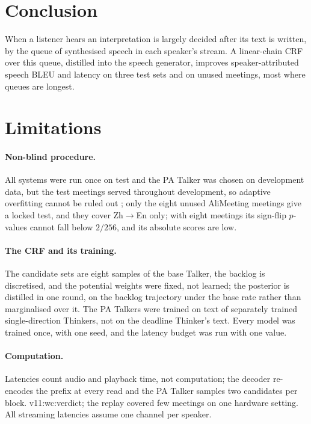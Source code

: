 \section{Conclusion}
\label{sec:conclusion}

When a listener hears an interpretation is largely decided after its text is written, by the queue of synthesised
speech in each speaker's stream. A linear-chain CRF over this queue, distilled into the speech generator, improves
speaker-attributed speech BLEU and latency on three test sets and on unused meetings, most where queues are longest.

\section*{Limitations}

\paragraph{Non-blind procedure.}\label{sec:res-hygiene} All systems were run once on test and the PA Talker was chosen
on development data, but the test meetings served throughout development, so adaptive overfitting cannot be ruled out%
\ifAliEval{}; only the eight unused AliMeeting meetings give a locked test, and they cover Zh$\rightarrow$En only;
with eight meetings its sign-flip $p$-values cannot fall below $2/256$, and its absolute scores are low\fi.

\paragraph{The CRF and its training.} The candidate sets are eight samples of the base Talker, the backlog is
discretised, and the potential weights were fixed, not learned; the posterior is distilled in one round, on the backlog
trajectory under the base rate rather than marginalised over it. The PA Talkers were trained on text of separately
trained single-direction Thinkers, not on the deadline Thinker's text. Every model was trained once, with one
seed, and the latency budget was run with one value.

\paragraph{Computation.} Latencies count audio and playback time, not computation; the decoder re-encodes the prefix
at every read and the PA Talker samples two candidates per block.\ifWallclock{} \num{v11:wc:verdict}; the replay
covered few meetings on one hardware setting.\fi{} All streaming latencies assume one channel per speaker.

